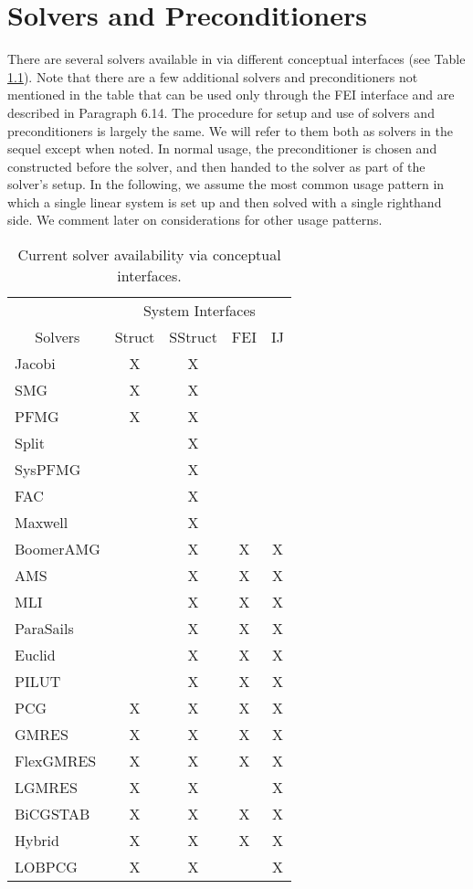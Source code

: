 
\chapter{Solvers and Preconditioners}
\label{ch-Solvers}

There are several solvers available in \hypre{} via different
conceptual interfaces (see Table \ref{table-solver-availability}).
Note that there are a few additional solvers and preconditioners not
mentioned in the table that can be used only through the FEI interface
and are described in Paragraph 6.14.
The procedure for setup and use of solvers and preconditioners is
largely the same. We will refer to them both as solvers in the sequel
except when noted.  In normal usage, the preconditioner is chosen and
constructed before the solver, and then handed to the solver as part
of the solver's setup.  In the following, we assume the most common
usage pattern in which a single linear system is set up and then
solved with a single righthand side. We comment later on
considerations for other usage patterns.

\begin{table}[h]
\center
\begin{tabular}{|l||c|c|c|c|}
\hline
                               & \multicolumn{4}{|c|}{System Interfaces} \\
\multicolumn{1}{|c||}{Solvers} & Struct & SStruct & FEI & IJ \\
\hline\hline
Jacobi     & X & X &   &   \\
SMG        & X & X &   &   \\
PFMG       & X & X &   &   \\
Split      &   & X &   &   \\
SysPFMG    &   & X &   &   \\
FAC        &   & X &   &   \\
Maxwell    &   & X &   &   \\
BoomerAMG  &   & X & X & X \\
AMS        &   & X & X & X \\
MLI        &   & X & X & X \\
ParaSails  &   & X & X & X \\
Euclid     &   & X & X & X \\
PILUT      &   & X & X & X \\
PCG        & X & X & X & X \\
GMRES      & X & X & X & X \\
FlexGMRES  & X & X & X & X \\
LGMRES     & X & X &   & X \\
BiCGSTAB   & X & X & X & X \\
Hybrid     & X & X & X & X \\
LOBPCG     & X & X &   & X \\
\hline
\end{tabular}
\caption{%
Current solver availability via \hypre{} conceptual interfaces.
}
\label{table-solver-availability}
\end{table}

